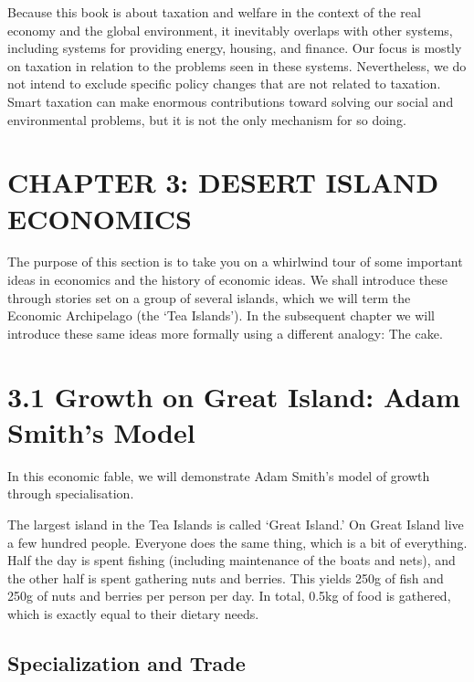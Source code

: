 \documentclass[]{tufte-handout}
\begin{document}
Because this book is about taxation and welfare in the context of the
real economy and the global environment, it inevitably overlaps with
other systems, including systems for providing energy, housing, and
finance. Our focus is mostly on taxation in relation to the problems
seen in these systems. Nevertheless, we do not intend to exclude
specific policy changes that are not related to taxation. Smart taxation
can make enormous contributions toward solving our social and
environmental problems, but it is not the only mechanism for so doing.

\newpage

\hypertarget{chapter-3-desert-island-economics}{%
\section{CHAPTER 3: DESERT ISLAND
ECONOMICS}\label{chapter-3-desert-island-economics}}

The purpose of this section is to take you on a whirlwind tour of some
important ideas in economics and the history of economic ideas. We shall
introduce these through stories set on a group of several islands, which
we will term the Economic Archipelago (the `Tea Islands'). In the
subsequent chapter we will introduce these same ideas more formally
using a different analogy: The cake.

\hypertarget{growth-on-great-island-adam-smiths-model}{%
\section{3.1 Growth on Great Island: Adam Smith's
Model}\label{growth-on-great-island-adam-smiths-model}}

In this economic fable, we will demonstrate Adam Smith's model of growth
through specialisation.

The largest island in the Tea Islands is called `Great Island.' On Great
Island live a few hundred people. Everyone does the same thing, which is
a bit of everything. Half the day is spent fishing (including
maintenance of the boats and nets), and the other half is spent
gathering nuts and berries. This yields 250g of fish and 250g of nuts
and berries per person per day. In total, 0.5kg of food is gathered,
which is exactly equal to their dietary needs.

\hypertarget{specialization-and-trade}{%
\subsection{Specialization and Trade}\label{specialization-and-trade}}
\end{document}
